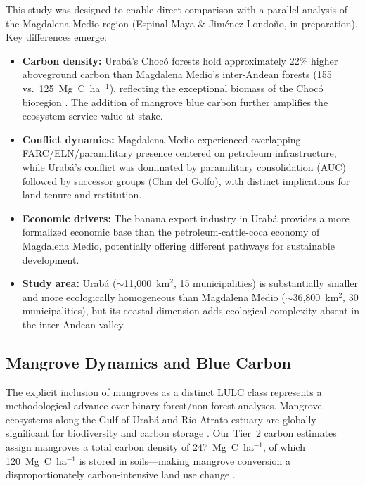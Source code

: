 \documentclass[12pt,a4paper]{article}
\begin{document}
This study was designed to enable direct comparison with a parallel analysis of the Magdalena Medio region (Espinal Maya \& Jim\'{e}nez Londo\~{n}o, in preparation). Key differences emerge:

\begin{itemize}
\item \textbf{Carbon density:} Urab\'{a}'s Choc\'{o} forests hold approximately 22\% higher aboveground carbon than Magdalena Medio's inter-Andean forests (155 vs.\ 125~Mg~C~ha$^{-1}$), reflecting the exceptional biomass of the Choc\'{o} bioregion \citep{Phillips2019}. The addition of mangrove blue carbon further amplifies the ecosystem service value at stake.
\item \textbf{Conflict dynamics:} Magdalena Medio experienced overlapping FARC/ELN/paramilitary presence centered on petroleum infrastructure, while Urab\'{a}'s conflict was dominated by paramilitary consolidation (AUC) followed by successor groups (Clan del Golfo), with distinct implications for land tenure and restitution.
\item \textbf{Economic drivers:} The banana export industry in Urab\'{a} provides a more formalized economic base than the petroleum-cattle-coca economy of Magdalena Medio, potentially offering different pathways for sustainable development.
\item \textbf{Study area:} Urab\'{a} (${\sim}$11,000~km$^2$, 15 municipalities) is substantially smaller and more ecologically homogeneous than Magdalena Medio (${\sim}$36,800~km$^2$, 30 municipalities), but its coastal dimension adds ecological complexity absent in the inter-Andean valley.
\end{itemize}

\subsection{Mangrove Dynamics and Blue Carbon}

The explicit inclusion of mangroves as a distinct LULC class represents a methodological advance over binary forest/non-forest analyses. Mangrove ecosystems along the Gulf of Urab\'{a} and R\'{i}o Atrato estuary are globally significant for biodiversity and carbon storage \citep{BlancoLibreros2012,BlancoLibreros2015,Polidoro2010}. Our Tier~2 carbon estimates assign mangroves a total carbon density of 247~Mg~C~ha$^{-1}$, of which 120~Mg~C~ha$^{-1}$ is stored in soils---making mangrove conversion a disproportionately carbon-intensive land use change \citep{Donato2011,Twilley2018,Alongi2014}.
\end{document}
